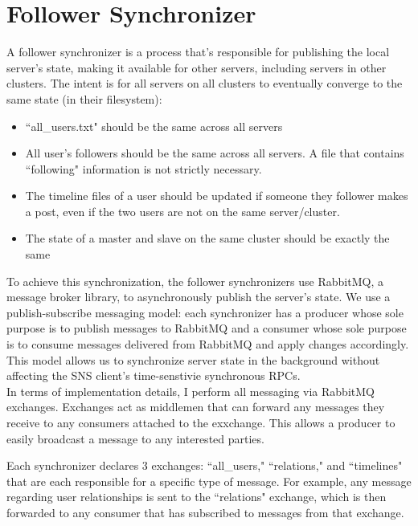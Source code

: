 \documentclass{article}
\begin{document}
\section{Follower Synchronizer}

A follower synchronizer is a process that's responsible for publishing the local server's state, making it available for other servers, including servers in other clusters. The intent is for all servers on all clusters to eventually converge to the same state (in their filesystem):

\begin{itemize}
	\item ``all\_users.txt" should be the same across all servers
	\item All user's followers should be the same across all servers. A file that contains ``following" information is not strictly necessary.
	\item The timeline files of a user should be updated if someone they follower makes a post, even if the two users are not on the same server/cluster.
	\item The state of a master and slave on the same cluster should be exactly the same
\end{itemize}

To achieve this synchronization, the follower synchronizers use RabbitMQ, a message broker library, to asynchronously publish the server's state. We use a publish-subscribe messaging model: each synchronizer has a producer whose sole purpose is to publish messages to RabbitMQ and a consumer whose sole purpose is to consume messages delivered from RabbitMQ and apply changes accordingly. This model allows us to synchronize server state in the background without affecting the SNS client's time-senstivie synchronous RPCs.\\

In terms of implementation details, I perform all messaging via RabbitMQ exchanges. Exchanges act as middlemen that can forward any messages they receive to any consumers attached to the exxchange. This allows a producer to easily broadcast a message to any interested parties.

Each synchronizer declares 3 exchanges: ``all\_users," ``relations," and ``timelines" that are each responsible for a specific type of message. For example, any message regarding user relationships is sent to the ``relations" exchange, which is then forwarded to any consumer that has subscribed to messages from that exchange.
\end{document}

